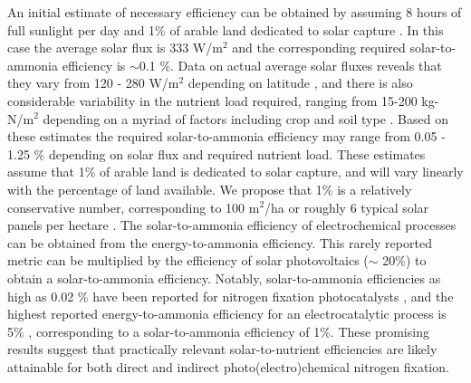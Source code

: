 An initial estimate of necessary efficiency can be obtained by assuming 8 hours of full sunlight per day and 1\% of arable land dedicated to solar capture \cite{Medford_2017}. In this case the average solar flux is 333 W/m$^2$ and the corresponding required solar-to-ammonia efficiency is $\sim$0.1 \%. Data on actual average solar fluxes reveals that they vary from 120 - 280 W/m$^2$ depending on latitude \cite{MacKay_2013}, and there is also considerable variability in the nutrient load required, ranging from 15-200 kg-N/m$^2$ depending on a myriad of factors including crop and soil type \needcite. Based on these estimates the required solar-to-ammonia efficiency may range from 0.05 - 1.25 \% depending on solar flux and required nutrient load. These estimates assume that 1\% of arable land is dedicated to solar capture, and will vary linearly with the percentage of land available. We propose that 1\% is a relatively conservative number, corresponding to 100 m$^2$/ha or roughly 6 typical solar panels per hectare \needcite. The solar-to-ammonia efficiency of electrochemical processes can be obtained from the energy-to-ammonia efficiency. This rarely reported metric can be multiplied by the efficiency of solar photovoltaics ($\sim$ 20\%) to obtain a solar-to-ammonia efficiency. Notably, solar-to-ammonia efficiencies as high as 0.02 \% have been reported for nitrogen fixation photocatalysts \cite{Hirakawa_2017}, and the highest reported energy-to-ammonia efficiency for an electrocatalytic process is 5\% \cite{Song_2018}, corresponding to a solar-to-ammonia efficiency of 1\%. These promising results suggest that practically relevant solar-to-nutrient efficiencies are likely attainable for both direct and indirect photo(electro)chemical nitrogen fixation. \needcite

